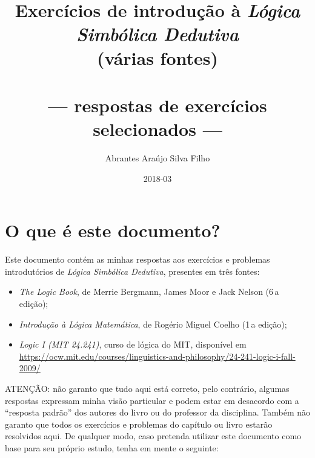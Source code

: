 \documentclass[pdftex,a4paper,12pt,brazil]{article} %
\newcommand{\unidado}[2]{{#1}\,{#2}}
\begin{document}
\title{Exercícios de introdução à \emph{Lógica Simbólica Dedutiva}\\
  (várias fontes)\\
  \ \\
--- respostas de exercícios selecionados ---}
\author{Abrantes Araújo Silva Filho}
\date{2018-03}
\maketitle
\tableofcontents


\section{O que é este documento?} 
\label{o_que_e}

Este documento contém as minhas respostas aos exercícios e problemas introdutórios de 
\emph{Lógica Simbólica Dedutiva}, presentes em três fontes:

\begin{itemize}
\item \emph{The Logic Book}, de Merrie Bergmann, James Moor e Jack Nelson (\unidado{6}{a}
  edição);
\item \emph{Introdução à Lógica Matemática}, de Rogério Miguel Coelho (\unidado{1}{a}
  edição);
\item \emph{Logic I (MIT 24.241)}, curso de lógica do MIT, disponível em
  \url{https://ocw.mit.edu/courses/linguistics-and-philosophy/24-241-logic-i-fall-2009/}
\end{itemize}

ATENÇÃO: não garanto que tudo aqui está correto, pelo contrário, algumas respostas expressam
minha visão particular e podem estar em desacordo com
a ``resposta padrão'' dos autores do livro ou do professor da disciplina. Também
não garanto que todos os exercícios e problemas do capítulo ou livro estarão resolvidos aqui.
De qualquer modo, caso pretenda
utilizar este documento como base para seu próprio estudo, tenha em mente o seguinte:
\end{document}
